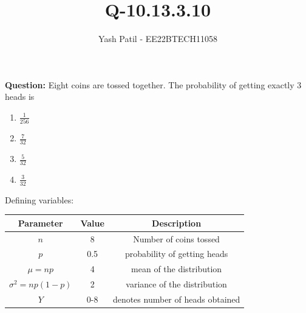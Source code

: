 \documentclass[journal,12pt,onecolumn]{IEEEtran}
\theoremstyle{remark}
\begin{document}



\vspace{3cm}

\title{
Q-10.13.3.10
}
\author{Yash Patil - EE22BTECH11058}

\maketitle
\textbf{Question:} Eight coins are tossed together. The probability of getting exactly 3 heads is
\begin{enumerate}
	\item $\frac{1}{256}$
	\item $\frac{7}{32}$
	\item $\frac{5}{32}$
	\item $\frac{3}{32}$
\end{enumerate}
\solution
Defining variables:
\begin{table}[H]
\def\arraystretch{1.2}
\begin{tabular}{|c|c|c|}
\hline
	\textbf{Parameter} &\textbf{Value} &\textbf{Description}\\ \hline
	$n$ &8 &Number of coins tossed\\ 
	\hline
	$p$ &0.5 & probability of getting heads\\ 
	\hline
	$\mu = np$ &4 & mean of the distribution\\ 
	\hline
	$\sigma^2 = np(1-p)$ &2 & variance of the distribution\\ 
	\hline
	$Y$ & 0-8 & denotes number of heads obtained\\
	\hline
\end{tabular}
\end{table}
\end{document}
